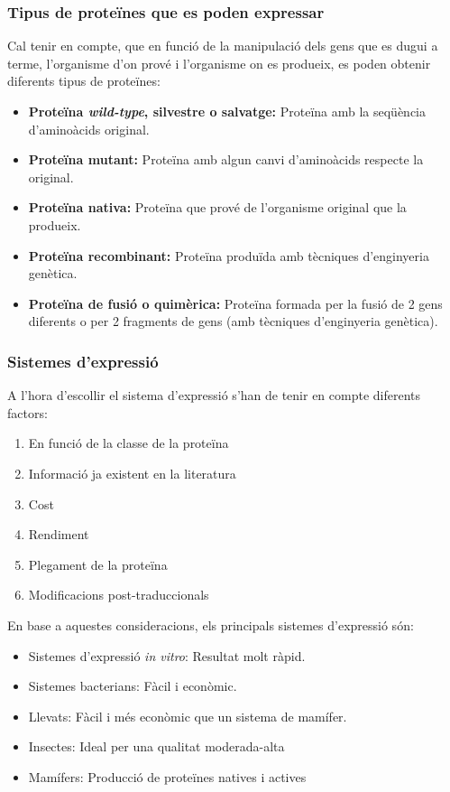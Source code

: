 \subsubsection{Tipus de proteïnes que es poden expressar}
\label{sec:tipus-de-proteines}
Cal tenir en compte, que en funció de la manipulació dels gens que es
dugui a terme, l'organisme d'on prové i l'organisme on es produeix, es
poden obtenir diferents tipus de proteïnes:
\begin{itemize}
\item \textbf{Proteïna \textit{wild-type}, silvestre o salvatge:} Proteïna amb
  la seqüència d'aminoàcids original.

\item \textbf{Proteïna mutant:} Proteïna amb algun canvi d'aminoàcids respecte
  la original.

\item \textbf{Proteïna nativa:} Proteïna que prové de l'organisme original que
  la produeix.

\item \textbf{Proteïna recombinant:} Proteïna produïda amb tècniques
  d'enginyeria genètica.

\item \textbf{Proteïna de fusió o quimèrica:} Proteïna formada per la fusió de
  2 gens diferents o per 2 fragments de gens (amb tècniques
  d'enginyeria genètica). 
\end{itemize}

\subsubsection{Sistemes d'expressió}
\label{sec:sistemes-dexpressio}
A l'hora d'escollir el sistema d'expressió s'han de tenir en compte
diferents factors:
\begin{multicols}{2}
\begin{enumerate}
\item En funció de la classe de la proteïna
\item Informació ja existent en la literatura
\item Cost
\item Rendiment
\item Plegament de la proteïna
\item Modificacions post-traduccionals
\end{enumerate}
\end{multicols}

En base a aquestes consideracions, els principals sistemes d'expressió
són:
\begin{itemize}
\item Sistemes d'expressió \textit{in vitro}: Resultat molt ràpid.
\item Sistemes bacterians: Fàcil i econòmic.
\item Llevats: Fàcil i més econòmic que un sistema de mamífer.
\item Insectes: Ideal per una qualitat moderada-alta
\item Mamífers: Producció de proteïnes natives i actives
\end{itemize}


